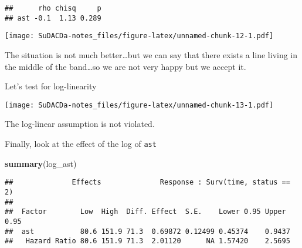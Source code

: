 \documentclass[]{book}
\newenvironment{Shaded}{\begin{snugshade}}{\end{snugshade}}
\newcommand{\KeywordTok}[1]{\textcolor[rgb]{0.13,0.29,0.53}{\textbf{{#1}}}}
\newcommand{\DataTypeTok}[1]{\textcolor[rgb]{0.13,0.29,0.53}{{#1}}}
\newcommand{\DecValTok}[1]{\textcolor[rgb]{0.00,0.00,0.81}{{#1}}}
\newcommand{\StringTok}[1]{\textcolor[rgb]{0.31,0.60,0.02}{{#1}}}
\newcommand{\NormalTok}[1]{{#1}}
\theoremstyle{definition}
\theoremstyle{definition}
\theoremstyle{definition}
\theoremstyle{remark}
\begin{document}
\begin{verbatim}
##      rho chisq     p
## ast -0.1  1.13 0.289
\end{verbatim}

\begin{Shaded}
\end{Shaded}

\texttt{[image: SuDACDa-notes\_files/figure-latex/unnamed-chunk-12-1.pdf]}

The situation is not much better\ldots{}but we can say that there exists
a line living in the middle of the band\ldots{}so we are not very happy
but we accept it.

Let's test for log-linearity

\begin{Shaded}
\end{Shaded}

\texttt{[image: SuDACDa-notes\_files/figure-latex/unnamed-chunk-13-1.pdf]}

The log-linear assumption is not violated.

Finally, look at the effect of the log of \texttt{ast}

\begin{Shaded}
\begin{Highlighting}[]
\KeywordTok{summary}\NormalTok{(log_ast)}
\end{Highlighting}
\end{Shaded}

\begin{verbatim}
##              Effects              Response : Surv(time, status == 2) 
## 
##  Factor        Low  High  Diff. Effect  S.E.    Lower 0.95 Upper 0.95
##  ast           80.6 151.9 71.3  0.69872 0.12499 0.45374    0.9437    
##   Hazard Ratio 80.6 151.9 71.3  2.01120      NA 1.57420    2.5695
\end{verbatim}
\end{document}
